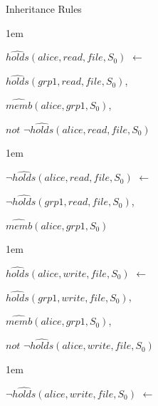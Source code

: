 \documentclass[global,twocolumn,final]{svjour}
\newenvironment{vexample}
  {\begin{example}\hspace{0.25em}}
  {\end{example}}
\newenvironment{vquote}
  {\begin{list}{}{\leftmargin 1em}\item[]}
  {\end{list}}
\begin{document}
\begin{vexample}
\begin{enumerate}
            \item
              Inheritance Rules

              \begin{vquote}
                $\hat{holds}(alice, read, file, S_{0})$ $\leftarrow$

                \hspace{1em}
                $\hat{holds}(grp1, read, file, S_{0})$,

                \hspace{1em}
                $\hat{memb}(alice, grp1, S_{0})$,

                \hspace{1em}
                $not$ $\lnot\hat{holds}(alice, read, file, S_{0})$
              \end{vquote}

              \begin{vquote}
                $\lnot\hat{holds}(alice, read, file, S_{0})$ $\leftarrow$

                \hspace{1em}
                $\lnot\hat{holds}(grp1, read, file, S_{0})$,

                \hspace{1em}
                $\hat{memb}(alice, grp1, S_{0})$
              \end{vquote}

              \begin{vquote}
                $\hat{holds}(alice, write, file, S_{0})$ $\leftarrow$

                \hspace{1em}
                $\hat{holds}(grp1, write, file, S_{0})$,

                \hspace{1em}
               $\hat{memb}(alice, grp1, S_{0})$,

                \hspace{1em}
                $not$ $\lnot\hat{holds}(alice, write, file, S_{0})$
              \end{vquote}

              \begin{vquote}
                $\lnot \hat{holds}(alice, write, file, S_{0})$ $\leftarrow$


\end{vquote}
\end{enumerate}
\end{vexample}
\end{document}

